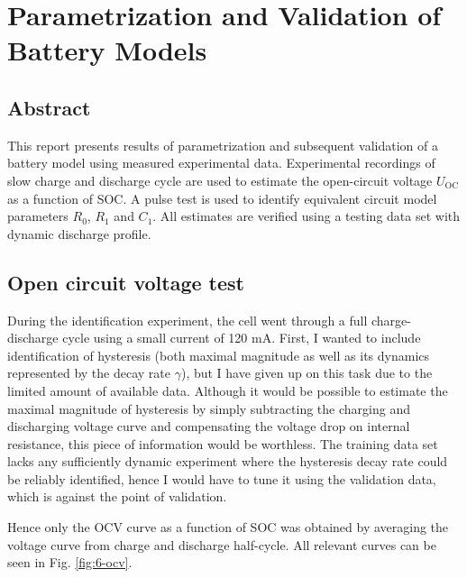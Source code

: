 
\chapter{Parametrization and Validation of Battery Models}

\section{Abstract}
This report presents results of parametrization and subsequent validation of a battery model using measured experimental data. Experimental recordings of slow charge and discharge cycle are used to estimate the open-circuit voltage $U_\text{OC}$ as a function of SOC. A pulse test is used to identify equivalent circuit model parameters $R_0$, $R_1$ and $C_1$. All estimates are verified using a testing data set with dynamic discharge profile.


\section{Open circuit voltage test}

During the identification experiment, the cell went through a full charge-discharge cycle using a small current of 120 mA. First, I wanted to include identification of hysteresis (both maximal magnitude as well as its dynamics represented by the decay rate $\gamma$), but I have given up on this task due to the limited amount of available data. Although it would be possible to estimate the maximal magnitude of hysteresis by simply subtracting the charging and discharging voltage curve and compensating the voltage drop on internal resistance, this piece of information would be worthless. The training data set lacks any sufficiently dynamic experiment where the hysteresis decay rate could be reliably identified, hence I would have to tune it using the validation data, which is against the point of validation.

Hence only the OCV curve as a function of SOC was obtained by averaging the voltage curve from charge and discharge half-cycle. All relevant curves can be seen in Fig. \ref{fig:6-ocv}.

